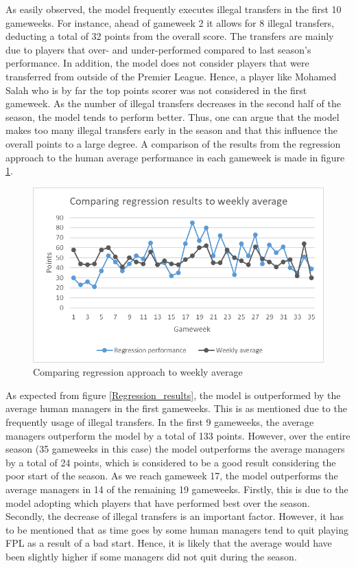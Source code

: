As easily observed, the model frequently executes illegal transfers in the first 10 gameweeks. For instance, ahead of gameweek 2 it allows for 8 illegal transfers, deducting a total of 32 points from the overall score. The transfers are mainly due to players that over- and under-performed compared to last season's performance. In addition, the model does not consider players that were transferred from outside of the Premier League. Hence, a player like Mohamed Salah who is by far the top points scorer was not considered in the first gameweek. As the number of illegal transfers decreases in the second half of the season, the model tends to perform better. Thus, one can argue that the model makes too many illegal transfers early in the season and that this influence the overall points to a large degree. 
\newpar
A comparison of the results from the regression approach to the human average performance in each gameweek is made in figure \ref{Regression_vs_average}.

\begin{figure}[H]
    \centering
    \includegraphics[scale=0.75]{fig/chapter_7/Weekly_average_regression.png}
    \caption{Comparing regression approach to weekly average}
\label{Regression_vs_average}    
\end{figure}

As expected from figure \ref{Regression_results}, the model is outperformed by the average human managers in the first gameweeks. This is as mentioned due to the frequently usage of illegal transfers. In the first 9 gameweeks, the average managers outperform the model by a total of 133 points. However, over the entire season (35 gameweeks in this case) the model outperforms the average managers by a total of 24 points, which is considered to be a good result considering the poor start of the season. As we reach gameweek 17, the model outperforms the average managers in 14 of the remaining 19 gameweeks. Firstly, this is due to the model adopting which players that have performed best over the season. Secondly, the decrease of illegal transfers is an important factor. However, it has to be mentioned that as time goes by some human managers tend to quit playing FPL as a result of a bad start. Hence, it is likely that the average would have been slightly higher if some managers did not quit during the season. 

